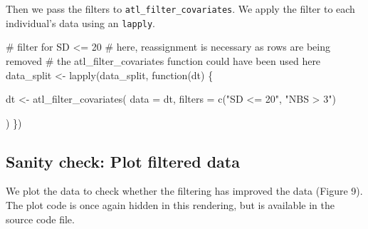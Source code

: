 \documentclass[]{scrreprt}
\newenvironment{Shaded}{}{}
\newcommand{\CommentTok}[1]{\textcolor[rgb]{0.00,0.50,0.00}{#1}}
\newcommand{\ControlFlowTok}[1]{\textcolor[rgb]{0.00,0.00,1.00}{#1}}
\newcommand{\DataTypeTok}[1]{#1}
\newcommand{\KeywordTok}[1]{\textcolor[rgb]{0.00,0.00,1.00}{#1}}
\newcommand{\NormalTok}[1]{#1}
\newcommand{\StringTok}[1]{\textcolor[rgb]{0.00,0.50,0.50}{#1}}
\begin{document}
Then we pass the filters to \texttt{atl\_filter\_covariates}.
We apply the filter to each individual's data using an \texttt{lapply}.

\begin{Shaded}
\begin{Highlighting}[]
\CommentTok{# filter for SD <= 20}
\CommentTok{# here, reassignment is necessary as rows are being removed}
\CommentTok{# the atl_filter_covariates function could have been used here}
\NormalTok{data_split <-}\StringTok{ }\KeywordTok{lapply}\NormalTok{(data_split, }\ControlFlowTok{function}\NormalTok{(dt) \{}
  
\NormalTok{  dt <-}\StringTok{ }\KeywordTok{atl_filter_covariates}\NormalTok{(}
    \DataTypeTok{data =}\NormalTok{ dt,}
    \DataTypeTok{filters =} \KeywordTok{c}\NormalTok{(}\StringTok{"SD <= 20"}\NormalTok{,}
                \StringTok{"NBS > 3"}\NormalTok{)}
    
\NormalTok{  )}
\NormalTok{\})}
\end{Highlighting}
\end{Shaded}

\hypertarget{sanity-check-plot-filtered-data}{%
\subsection{Sanity check: Plot filtered data}\label{sanity-check-plot-filtered-data}}

We plot the data to check whether the filtering has improved the data (Figure 9).
The plot code is once again hidden in this rendering, but is available in the source code file.
\end{document}
